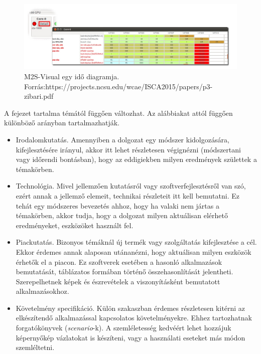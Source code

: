 \begin{figure}[h]
\centering
\includegraphics[scale=0.5]{images/m2sv2.jpg}
\caption{M2S-Visual egy idő diagramja. \\ Forrás:https://projects.ncsu.edu/wcae/ISCA2015/papers/p3-zibari.pdf}
\label{fig:m2sv}
\end{figure}


A fejezet tartalma témától függően változhat. Az alábbiakat attól függően különböző arányban tartalmazhatják.
\begin{itemize}
\item Irodalomkutatás. Amennyiben a dolgozat egy módszer kidolgozására, kifejlesztésére irányul, akkor itt lehet részletesen végignézni (módszertani vagy időrendi bontásban), hogy az eddigiekben milyen eredmények születtek a témakörben.
\item Technológia. Mivel jellemzően kutatásról vagy szoftverfejlesztésről van szó, ezért annak a jellemző elemeit, technikai részleteit itt kell bemutatni.
Ez tehát egy módszeres bevezetés ahhoz, hogy ha valaki nem jártas a témakörben, akkor tudja, hogy a dolgozat milyen aktuálisan elérhető eredményeket, eszközöket használt fel.
\item Piackutatás. Bizonyos témáknál új termék vagy szolgáltatás kifejlesztése a cél.
Ekkor érdemes annak alaposan utánanézni, hogy aktuálisan milyen eszközök érhetők el a piacon.
Ez szoftverek esetében a hasonló alkalmazások bemutatását, táblázatos formában történő összehasonlítását jelentheti.
Szerepelhetnek képek és észrevételek a viszonyításként bemutatott alkalmazásokhoz.
\item Követelmény specifikáció. Külön szakaszban érdemes részletesen kitérni az elkészítendő alkalmazással kapcsolatos követelményekre.
Ehhez tartozhatnak forgatókönyvek (\textit{scenario}-k).
A szemléletesség kedvéért lehet hozzájuk képernyőkép vázlatokat is készíteni, vagy a használati eseteket más módon szemléltetni.
\end{itemize}

%
